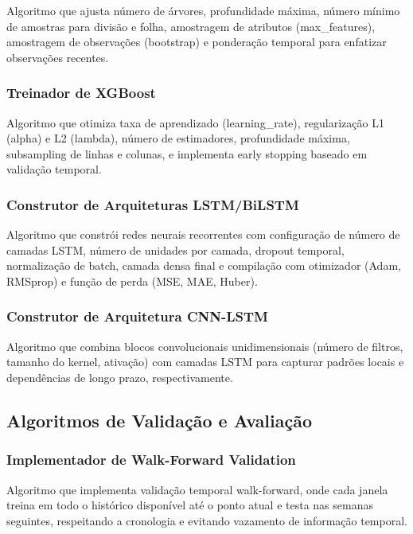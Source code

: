 Algoritmo que ajusta número de árvores, profundidade máxima, número mínimo de amostras para divisão e folha, amostragem de atributos (max\_features), amostragem de observações (bootstrap) e ponderação temporal para enfatizar observações recentes.

\subsubsection{Treinador de XGBoost}

Algoritmo que otimiza taxa de aprendizado (learning\_rate), regularização L1 (alpha) e L2 (lambda), número de estimadores, profundidade máxima, subsampling de linhas e colunas, e implementa early stopping baseado em validação temporal.

\subsubsection{Construtor de Arquiteturas LSTM/BiLSTM}

Algoritmo que constrói redes neurais recorrentes com configuração de número de camadas LSTM, número de unidades por camada, dropout temporal, normalização de batch, camada densa final e compilação com otimizador (Adam, RMSprop) e função de perda (MSE, MAE, Huber).

\subsubsection{Construtor de Arquitetura CNN-LSTM}

Algoritmo que combina blocos convolucionais unidimensionais (número de filtros, tamanho do kernel, ativação) com camadas LSTM para capturar padrões locais e dependências de longo prazo, respectivamente.

\subsection{Algoritmos de Validação e Avaliação}

\subsubsection{Implementador de Walk-Forward Validation}

Algoritmo que implementa validação temporal walk-forward, onde cada janela treina em todo o histórico disponível até o ponto atual e testa nas semanas seguintes, respeitando a cronologia e evitando vazamento de informação temporal.

